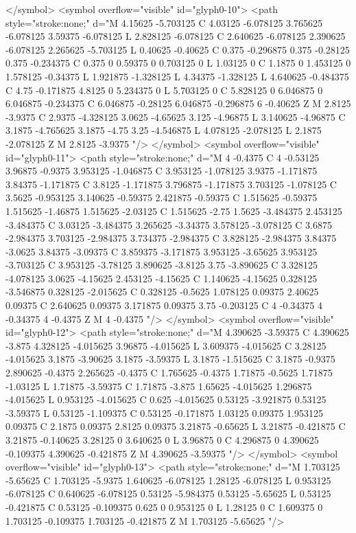 </symbol>
<symbol overflow="visible" id="glyph0-10">
<path style="stroke:none;" d="M 4.15625 -5.703125 C 4.03125 -6.078125 3.765625 -6.078125 3.59375 -6.078125 L 2.828125 -6.078125 C 2.640625 -6.078125 2.390625 -6.078125 2.265625 -5.703125 L 0.40625 -0.40625 C 0.375 -0.296875 0.375 -0.28125 0.375 -0.234375 C 0.375 0 0.59375 0 0.703125 0 L 1.03125 0 C 1.1875 0 1.453125 0 1.578125 -0.34375 L 1.921875 -1.328125 L 4.34375 -1.328125 L 4.640625 -0.484375 C 4.75 -0.171875 4.8125 0 5.234375 0 L 5.703125 0 C 5.828125 0 6.046875 0 6.046875 -0.234375 C 6.046875 -0.28125 6.046875 -0.296875 6 -0.40625 Z M 2.8125 -3.9375 C 2.9375 -4.328125 3.0625 -4.65625 3.125 -4.96875 L 3.140625 -4.96875 C 3.1875 -4.765625 3.1875 -4.75 3.25 -4.546875 L 4.078125 -2.078125 L 2.1875 -2.078125 Z M 2.8125 -3.9375 "/>
</symbol>
<symbol overflow="visible" id="glyph0-11">
<path style="stroke:none;" d="M 4 -0.4375 C 4 -0.53125 3.96875 -0.9375 3.953125 -1.046875 C 3.953125 -1.078125 3.9375 -1.171875 3.84375 -1.171875 C 3.8125 -1.171875 3.796875 -1.171875 3.703125 -1.078125 C 3.5625 -0.953125 3.140625 -0.59375 2.421875 -0.59375 C 1.515625 -0.59375 1.515625 -1.46875 1.515625 -2.03125 C 1.515625 -2.75 1.5625 -3.484375 2.453125 -3.484375 C 3.03125 -3.484375 3.265625 -3.34375 3.578125 -3.078125 C 3.6875 -2.984375 3.703125 -2.984375 3.734375 -2.984375 C 3.828125 -2.984375 3.84375 -3.0625 3.84375 -3.09375 C 3.859375 -3.171875 3.953125 -3.65625 3.953125 -3.703125 C 3.953125 -3.78125 3.890625 -3.8125 3.75 -3.890625 C 3.328125 -4.078125 3.0625 -4.15625 2.453125 -4.15625 C 1.140625 -4.15625 0.328125 -3.546875 0.328125 -2.015625 C 0.328125 -0.5625 1.078125 0.09375 2.40625 0.09375 C 2.640625 0.09375 3.171875 0.09375 3.75 -0.203125 C 4 -0.34375 4 -0.34375 4 -0.4375 Z M 4 -0.4375 "/>
</symbol>
<symbol overflow="visible" id="glyph0-12">
<path style="stroke:none;" d="M 4.390625 -3.59375 C 4.390625 -3.875 4.328125 -4.015625 3.96875 -4.015625 L 3.609375 -4.015625 C 3.28125 -4.015625 3.1875 -3.90625 3.1875 -3.59375 L 3.1875 -1.515625 C 3.1875 -0.9375 2.890625 -0.4375 2.265625 -0.4375 C 1.765625 -0.4375 1.71875 -0.5625 1.71875 -1.03125 L 1.71875 -3.59375 C 1.71875 -3.875 1.65625 -4.015625 1.296875 -4.015625 L 0.953125 -4.015625 C 0.625 -4.015625 0.53125 -3.921875 0.53125 -3.59375 L 0.53125 -1.109375 C 0.53125 -0.171875 1.03125 0.09375 1.953125 0.09375 C 2.1875 0.09375 2.8125 0.09375 3.21875 -0.65625 L 3.21875 -0.421875 C 3.21875 -0.140625 3.28125 0 3.640625 0 L 3.96875 0 C 4.296875 0 4.390625 -0.109375 4.390625 -0.421875 Z M 4.390625 -3.59375 "/>
</symbol>
<symbol overflow="visible" id="glyph0-13">
<path style="stroke:none;" d="M 1.703125 -5.65625 C 1.703125 -5.9375 1.640625 -6.078125 1.28125 -6.078125 L 0.953125 -6.078125 C 0.640625 -6.078125 0.53125 -5.984375 0.53125 -5.65625 L 0.53125 -0.421875 C 0.53125 -0.109375 0.625 0 0.953125 0 L 1.28125 0 C 1.609375 0 1.703125 -0.109375 1.703125 -0.421875 Z M 1.703125 -5.65625 "/>
